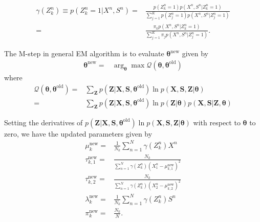 \documentclass[11pt]{extarticle}
\renewcommand{\S}{\mathbf{S}}
\newcommand{\X}{\mathbf{X}}
\newcommand{\Z}{\mathbf{Z}}
\newcommand{\0}{\mathbf{0}}
\renewcommand{\(}{\left(}
\renewcommand{\)}{\right)}
\theoremstyle{definition}
\begin{document}
\begin{align*}
	\gamma(Z^{n}_{k}) \equiv p(Z^{n}_{k} = 1 \vert X^{n}, S^{n}) =& \frac{p(Z^{n}_{k}=1)p(X^{n}, S^{n} \vert Z^{n}_{k} = 1)}{\sum_{j=1}^{K}p(Z^{n}_{j}=1)p(X^{n}, S^{n} \vert Z^{n}_{j}=1)} \\
	=& \frac{\pi_{k} p(X^{n}, S^{n} \vert Z^{n}_{k} = 1)}{\sum_{j=1}^{K}\pi_{j} p(X^{n}, S^{n} \vert Z^{n}_{j}=1)}.
\end{align*}
\par The M-step in general EM algorithm is to evaluate $\bm{\theta}^{\mathrm{new}}$ given by
\begin{align*}
	\bm{\theta}^{\mathrm{new}} =& \arg_{\bm{\theta}}\max \mathcal{Q}(\bm{\theta}, \bm{\theta}^{\mathrm{old}})
\end{align*}
where
\begin{align*}
	\mathcal{Q}(\bm{\theta}, \bm{\theta}^{\mathrm{old}}) =& \sum_{\mathbf{Z}} p(\mathbf{Z} \vert \mathbf{X}, \mathbf{S}, \bm{\theta}^{\mathrm{old}}) \ln p(\mathbf{X}, \mathbf{S}, \mathbf{Z} \vert \bm{\theta}) \\
	=& \sum_{\mathbf{Z}} p(\mathbf{Z} \vert \mathbf{X}, \mathbf{S}, \bm{\theta}^{\mathrm{old}}) \ln p(\mathbf{Z} \vert \bm{\theta}) p(\mathbf{X}, \mathbf{S} \vert \mathbf{Z}, \bm{\theta})
\end{align*}
\par Setting the derivatives of $p(\Z \vert \X, \S, \bm{\theta}^{\mathrm{old}})\ln p(\X, \S, \Z \vert \bm{\theta})$ with respect to $\bm{\theta}$ to zero, we have the updated parameters given by
\begin{align*}
	\mu_{k}^{\mathrm{new}} =& \frac{1}{N_{k}} \sum_{n=1}^{N} \gamma(Z^{n}_{k}) X^{n} \\
	\tau_{k,1}^{\mathrm{new}} =& \frac{N_{k}}{\sum_{n=1}^{N} \gamma(Z^{n}_{k}) (X^{n}_{1} - \mu_{k,1}^{\mathrm{new}})^{2}} \\
	\tau_{k,2}^{\mathrm{new}} =& \frac{N_{k}}{\sum_{n=1}^{N} \gamma(Z^{n}_{k}) (X^{n}_{2} - \mu_{k,2}^{\mathrm{new}})^{2}} \\
	\lambda_{k}^{\mathrm{new}} =& \frac{1}{N_{k}} \sum_{n=1}^{N} \gamma(Z^{n}_{k}) S^{n} \\
	\pi_{k}^{\mathrm{new}} =& \frac{N_{k}}{N}.
\end{align*}
\end{document}
